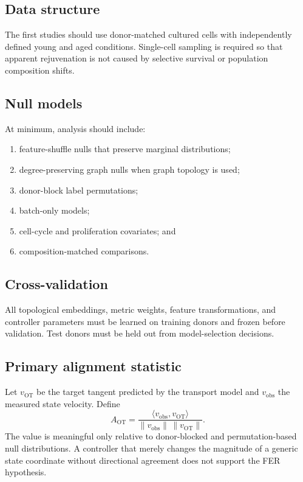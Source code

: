 \documentclass[11pt]{article}
\begin{document}
\subsection{Data structure}
The first studies should use donor-matched cultured cells with independently defined young and aged conditions. Single-cell sampling is required so that apparent rejuvenation is not caused by selective survival or population composition shifts.

\subsection{Null models}
At minimum, analysis should include:
\begin{enumerate}[leftmargin=1.45em]
\item feature-shuffle nulls that preserve marginal distributions;
\item degree-preserving graph nulls when graph topology is used;
\item donor-block label permutations;
\item batch-only models;
\item cell-cycle and proliferation covariates; and
\item composition-matched comparisons.
\end{enumerate}

\subsection{Cross-validation}
All topological embeddings, metric weights, feature transformations, and controller parameters must be learned on training donors and frozen before validation. Test donors must be held out from model-selection decisions.

\subsection{Primary alignment statistic}
Let $v_{\mathrm{OT}}$ be the target tangent predicted by the transport model and $v_{\mathrm{obs}}$ the measured state velocity. Define
\begin{equation}
 A_{\mathrm{OT}}=\frac{\langle v_{\mathrm{obs}},v_{\mathrm{OT}}\rangle}{\|v_{\mathrm{obs}}\|\,\|v_{\mathrm{OT}}\|}.
\label{eq:alignment}
\end{equation}
The value is meaningful only relative to donor-blocked and permutation-based null distributions. A controller that merely changes the magnitude of a generic state coordinate without directional agreement does not support the FER hypothesis.
\end{document}
